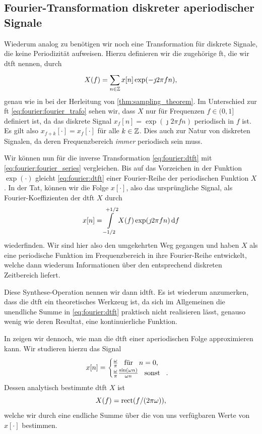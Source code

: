 \subsection{Fourier-Transformation diskreter aperiodischer Signale}\label{sec:fourier:disc_aperiod}
%
Wiederum analog zu  benötigen wir noch eine Transformation für diskrete Signale, die keine Periodizität aufweisen.
Hierzu definieren wir die zugehörige \gls{ft}, die wir \gls{dtft} nennen, durch
\begin{equation}\label{eq:fourier:dtft}
    X(f) = {\sum\limits_{n \in \mathbb{Z}}^{}{x[n] \exp(-\jmath 2 \pi f n)}},
\end{equation}
genau wie in  bei der Herleitung von \eqref{thm:sampling_theorem}.
Im Unterschied zur  \gls{ft} \eqref{eq:fourier:fourier_trafo} sehen wir, dass $X$ nur für Frequenzen $f \in (0,1]$ definiert ist, da das diskrete Signal $x_f[n] = \exp(\jmath 2 \pi f n)$ periodisch in $f$ ist.
Es gilt also $x_{f + k}[\cdot] = x_{f}[\cdot]$ für alle $k \in \mathbb{Z}$.
Dies  auch zur Natur von diskreten Signalen, da deren Frequenzbereich \emph{immer} periodisch sein muss.

Wir können nun für die inverse Transformation \eqref{eq:fourier:dtft} mit \eqref{eq:fourier:fourier_series} vergleichen. 
Bis auf das Vorzeichen in der Funktion $\exp(\cdot)$ gleicht \eqref{eq:fourier:dtft} einer Fourier-Reihe der periodischen Funktion $X$.
In der Tat, können wir die Folge $x[\cdot]$, also das ursprüngliche Signal, als Fourier-Koeffizienten der \gls{dtft} $X$ durch
\begin{equation}\label{eq:fourier:idtft}
    x[n] = {\int\limits_{-1/2}^{+1/2}{X(f)\exp(\jmath 2 \pi f n)}\,\mathrm{d}{f}}
\end{equation}
wiederfinden.
Wir sind hier also den umgekehrten Weg gegangen und haben $X$ als eine periodische Funktion im Frequenzbereich in ihre Fourier-Reihe entwickelt, welche dann wiederum Informationen über den entsprechend diskreten Zeitbereich liefert.

Diese Synthese-Operation nennen wir dann \gls{idtft}.
Es ist wiederum anzumerken, dass die \gls{dtft}  ein theoretisches Werkzeug ist, da sich im Allgemeinen die unendliche Summe in \eqref{eq:fourier:dtft} praktisch nicht realisieren lässt, genauso wenig wie deren Resultat, eine kontinuierliche Funktion.

In  zeigen wir dennoch, wie man die \gls{dtft} einer aperiodischen Folge approximieren kann.
Wir studieren hierzu das Signal
\[
x[n] = \begin{cases}
    \frac{\omega}{\pi} {\hspace{3mm} \text{für} \hspace{3mm}} n = 0,\\
    \frac{\omega}{\pi} \frac{\sin(\omega n)}{\omega n} {\hspace{3mm} \text{sonst} \hspace{3mm}}.
\end{cases}
\]
Dessen analytisch bestimmte \gls{dtft} $X$ ist
\[
X(f) = \operatorname{rect}(f/(2 \pi \omega)),
\]
welche wir durch eine endliche Summe über die von uns verfügbaren Werte von $x[\cdot]$ bestimmen.

